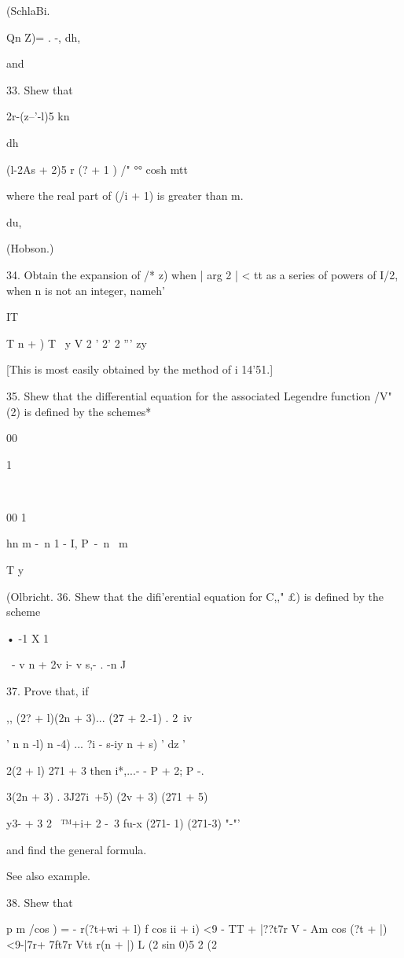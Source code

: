 {{{{(SchlaBi.

Qn Z)= . -, dh,

and

33. Shew that


 2r-(z--'-l)5 kn

dh

(l-2As + 2)5 r (? + 1 ) /" °° cosh mtt

where the real part of (/i + 1) is greater than m.

du,

(Hobson.)

34. Obtain the expansion of /* z) when | arg 2 | < tt as a series of
powers of I/2, when n is not an integer, nameh'

IT

T n + ) T \ y V 2 ' 2' 2 ''' zy

[This is most easily obtained by the method of i 14'51.]

35. Shew that the differential equation for the associated Legendre
function /V" (2) is defined by the schemes*

00

1

\

00 1

hn m -\ n 1 - I, P\ -\ n \ m ~

T y

(Olbricht. 36. Shew that the difi'erential equation for C,," £) is
defined by the scheme

• -1 X 1 \

\ - v n + 2v i- v s,- . -n J

37. Prove that, if

,, (2? + l)(2n + 3)... (27 + 2.-1) . 2\ iv

 ' n n -l) n -4) ... ?i - s-iy n + s) ' dz '

2(2 + l) 271 + 3 then i*,...- - P + 2; P -.

3(2n + 3) . 3J27i\ +5) (2v + 3) (271 + 5)

y3- + 3 2 \ ™+i+ 2 -\ 3 fu-x (271- 1) (271-3) "-"'

and find the general formula.


See also example.

%
%

38. Shew that

p m /cos ) = - r(?t+wi + l) f cos ii + i) <9 - TT + |??t7r V - Am cos
(?t + |)<9-|7r+ 7ft7r Vtt r(n + |) L (2 sin 0)5 2 (2%

}}}}
